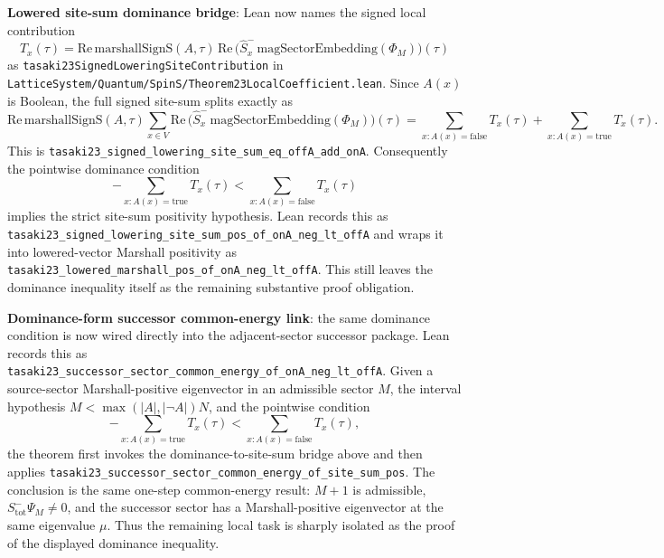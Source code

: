 \documentclass[a4paper,11pt]{article}
\begin{document}
\textbf{Lowered site-sum dominance bridge}: Lean now names the signed
local contribution
\[
  T_x(\tau)=
  \mathrm{Re}\,\mathrm{marshallSignS}(A,\tau)\,
  \mathrm{Re}\,
  \bigl(\hat S^-_x\,\mathrm{magSectorEmbedding}(\Phi_M)\bigr)(\tau)
\]
as \texttt{tasaki23SignedLoweringSiteContribution} in
\texttt{LatticeSystem/Quantum/SpinS/Theorem23LocalCoefficient.lean}.
Since \(A(x)\) is
Boolean, the full signed site-sum splits exactly as
\[
  \mathrm{Re}\,\mathrm{marshallSignS}(A,\tau)
  \sum_{x\in V}
  \mathrm{Re}\,
  \bigl(\hat S^-_x\,\mathrm{magSectorEmbedding}(\Phi_M)\bigr)(\tau)
  =
  \sum_{x:A(x)=\mathrm{false}} T_x(\tau)
  +
  \sum_{x:A(x)=\mathrm{true}} T_x(\tau).
\]
This is
\texttt{tasaki23\_signed\_lowering\_site\_sum\_eq\_offA\_add\_onA}.
Consequently the pointwise dominance condition
\[
  -\sum_{x:A(x)=\mathrm{true}} T_x(\tau)
  <
  \sum_{x:A(x)=\mathrm{false}} T_x(\tau)
\]
implies the strict site-sum positivity hypothesis.  Lean records this
as
\texttt{tasaki23\_signed\_lowering\_site\_sum\_pos\_of\_onA\_neg\_lt\_offA}
and wraps it into lowered-vector Marshall positivity as
\texttt{tasaki23\_lowered\_marshall\_pos\_of\_onA\_neg\_lt\_offA}.  This
still leaves the dominance inequality itself as the remaining
substantive proof obligation.

\textbf{Dominance-form successor common-energy link}: the same
dominance condition is now wired directly into the adjacent-sector
successor package.  Lean records this as
\texttt{tasaki23\_successor\_sector\_common\_energy\_of\_onA\_neg\_lt\_offA}.
Given a source-sector Marshall-positive eigenvector in an admissible
sector \(M\), the interval hypothesis \(M < \max(|A|,|\neg A|)N\),
and the pointwise condition
\[
  -\sum_{x:A(x)=\mathrm{true}} T_x(\tau)
  <
  \sum_{x:A(x)=\mathrm{false}} T_x(\tau),
\]
the theorem first invokes the dominance-to-site-sum bridge above and
then applies
\texttt{tasaki23\_successor\_sector\_common\_energy\_of\_site\_sum\_pos}.
The conclusion is the same one-step common-energy result: \(M+1\) is
admissible, \(S^-_{\mathrm{tot}}\Psi_M\ne 0\), and the successor sector
has a Marshall-positive eigenvector at the same eigenvalue \(\mu\).
Thus the remaining local task is sharply isolated as the proof of the
displayed dominance inequality.
\end{document}
